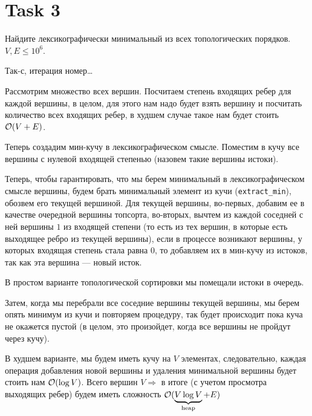 \section{Task 3}
\begin{task}
    Найдите лексикографически минимальный из всех топологических порядков. $V, E \leq 10^6$.
\end{task}

\begin{solution}
    Так-с, итерация номер\dots

    Рассмотрим множество всех вершин.
    Посчитаем степень входящих ребер для каждой вершины, в целом, для этого нам надо будет взять вершину и посчитать количество всех входящих ребер, в худшем случае такое нам будет стоить $\mathcal{O}(V + E)$.

    Теперь создадим мин-кучу в лексикографическом смысле.
    Поместим в кучу все вершины с нулевой входящей степенью (назовем такие вершины истоки).

    Теперь, чтобы гарантировать, что мы берем минимальный в лексикографическом смысле вершины, будем брать минимальный элемент из кучи (\texttt{extract\_min}), обозвем его текущей вершиной.
    Для текущей вершины, во-первых, добавим ее в качестве очередной вершины топсорта, во-вторых, вычтем из каждой соседней с ней вершины $1$ из входящей степени (то есть из тех вершин, в которые есть выходящее ребро из текущей вершины), если в процессе возникают вершины, у которых входящая степень стала равна $0$, то добавляем их в мин-кучу из истоков, так как эта вершина --- новый исток.
    \begin{remark}
        В простом варианте топологической сортировки мы помещали истоки в очередь.
    \end{remark}
    Затем, когда мы перебрали все соседние вершины текущей вершины, мы берем опять минимум из кучи и повторяем процедуру, так будет происходит пока куча не окажется пустой (в целом, это произойдет, когда все вершины не пройдут через кучу).

    В худшем варианте, мы будем иметь кучу на $V$ элементах, следовательно, каждая операция добавления новой вершины и удаления минимальной вершины будет стоить нам $\mathcal{O}(\log V)$.
    Всего вершин $V \Longrightarrow $ в итоге (с учетом просмотра выходящих ребер) будем иметь сложность $\mathcal{O}(\underbrace{V\log V}_{\text{heap}} + E)$
\end{solution}
